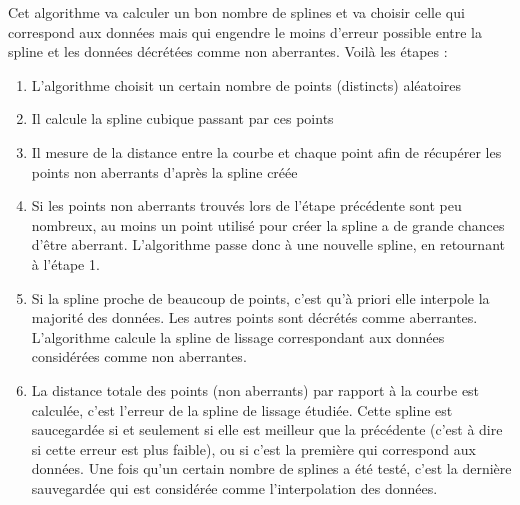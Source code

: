 \documentclass[a4paper,12pt]{article} %
\begin{document}
                    Cet algorithme va calculer un bon nombre de splines et va choisir celle qui correspond aux données mais qui engendre le moins d'erreur possible entre la spline et les données décrétées comme non aberrantes. Voilà les étapes :\\
                    \begin{enumerate}
                    \item
                    L'algorithme choisit un certain nombre de points (distincts) aléatoires
                    \item
                    Il calcule la spline cubique passant par ces points 
                    \item
                    Il mesure de la distance entre la courbe et chaque point afin de récupérer les points non aberrants d'après la spline créée
                    \item
                    Si les points non aberrants trouvés lors de l'étape précédente sont peu nombreux, au moins un point utilisé pour créer la spline a de grande chances d'être aberrant. L'algorithme passe donc à une nouvelle spline, en retournant à l'étape 1.
                    \item
                    Si la spline proche de beaucoup de points, c'est qu'à priori elle interpole la majorité des données. Les autres points sont décrétés comme aberrantes.  L'algorithme calcule la spline de lissage correspondant aux données considérées comme non aberrantes.
                    \item
                    La distance totale des points (non aberrants) par rapport à la courbe est calculée, c'est l'erreur de la spline de lissage étudiée. Cette spline est saucegardée si et seulement si elle est meilleur que la précédente (c'est à dire si cette erreur est plus faible), ou si c'est la première qui correspond aux données.
                    Une fois qu'un certain nombre de splines a été testé, c'est la dernière sauvegardée qui est considérée comme l'interpolation des données.
                    \end{enumerate} 
                    
\end{document}
